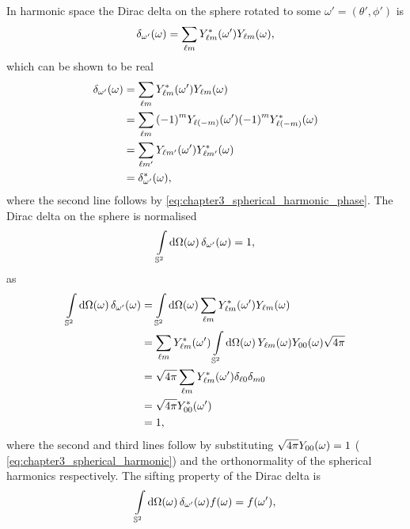 In harmonic space the Dirac delta on the sphere rotated to some \(\omega'=(\theta',\phi')\) is
%
\begin{equation}
	\pixel{\delta_{\omega'}}
	= \harmonicSum \pixel[']{\conj{\harmonic{Y}}} \pixel{\harmonic{Y}},
\end{equation}
%
which can be shown to be real
%
\begin{align}\label{eq:chapter3_dirac_delta_real}
	\pixel{\delta_{\omega'}}
	 & = \harmonicSum \pixel[']{\conj{\harmonic{Y}}} \pixel{\harmonic{Y}} \nonumber{}                       \\
	 & = \harmonicSum {(-1)}^{m} \pixel[']{Y_{\ell(-m)}} {(-1)}^{m} \pixel{\conj{Y_{\ell(-m)}}} \nonumber{} \\
	 & = \sum\limits_{\ell m'} \pixel[']{Y_{\ell m'}} \pixel{\conj{Y_{\ell m'}}} \nonumber{}                \\
	 & = \pixel{\conj{\delta_{\omega'}}},
\end{align}
%
where the second line follows by \cref{eq:chapter3_spherical_harmonic_phase}.
The Dirac delta on the sphere is normalised
%
\begin{equation}
	\integrateSphere{\omega} \pixel{\delta_{\omega'}}
	= 1,
\end{equation}
%
as
%
\begin{align}
	\integrateSphere{\omega} \pixel{\delta_{\omega'}}
	 & = \integrateSphere{\omega} \harmonicSum \pixel[']{\conj{\harmonic{Y}}} \pixel{\harmonic{Y}} \nonumber{}                            \\
	 & = \harmonicSum \pixel[']{\conj{\harmonic{Y}}} \integrateSphere{\omega} \pixel{\harmonic{Y}} \pixel{Y_{00}} \sqrt{4\pi} \nonumber{} \\
	 & = \sqrt{4\pi} \harmonicSum \pixel[']{\conj{\harmonic{Y}}} \delta_{\ell0} \delta_{m0} \nonumber{}                                   \\
	 & = \sqrt{4\pi} \pixel[']{\conj{Y_{00}}} \nonumber{}                                                                                 \\
	 & = 1,
\end{align}
%
where the second and third lines follow by substituting \(\sqrt{4\pi}\pixel{Y_{00}}=1\) (\cf{} \cref{eq:chapter3_spherical_harmonic}) and the orthonormality of the spherical harmonics respectively.
The sifting property of the Dirac delta is
%
\begin{equation}
	\integrateSphere{\omega} \pixel{\delta_{\omega'}} \pixel{f}
	= \pixel[']{f},
\end{equation}
